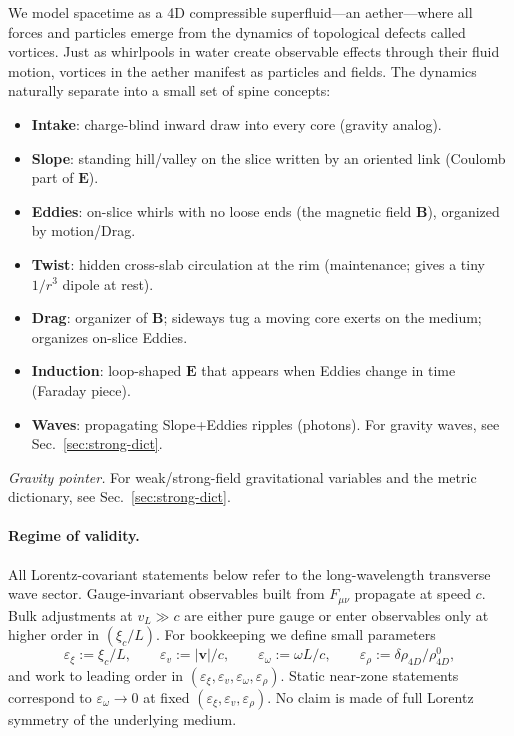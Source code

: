 We model spacetime as a 4D compressible superfluid---an aether---where all forces and particles emerge from the dynamics of topological defects called vortices. Just as whirlpools in water create observable effects through their fluid motion, vortices in the aether manifest as particles and fields. The dynamics naturally separate into a small set of spine concepts:
\begin{itemize}
  \item \textbf{Intake}: charge-blind inward draw into every core (gravity analog).
  \item \textbf{Slope}: standing hill/valley on the slice written by an oriented link (Coulomb part of $\mathbf E$).
  \item \textbf{Eddies}: on-slice whirls with no loose ends (the magnetic field $\mathbf B$), organized by motion/Drag.
  \item \textbf{Twist}: hidden cross-slab circulation at the rim (maintenance; gives a tiny $1/r^3$ dipole at rest).
  \item \textbf{Drag}: organizer of $\mathbf B$; sideways tug a moving core exerts on the medium; organizes on-slice Eddies.
  \item \textbf{Induction}: loop-shaped $\mathbf E$ that appears when Eddies change in time (Faraday piece).
  \item \textbf{Waves}: propagating Slope+Eddies ripples (photons). For gravity waves, see Sec.~\ref{sec:strong-dict}.
\end{itemize}
\noindent\emph{Gravity pointer.} For weak/strong-field gravitational variables and the metric dictionary, see Sec.~\ref{sec:strong-dict}.
\paragraph{Regime of validity.} All Lorentz-covariant statements below refer to the long-wavelength transverse wave sector. Gauge-invariant observables built from $F_{\mu\nu}$ propagate at speed $c$. Bulk adjustments at $v_L\gg c$ are either pure gauge or enter observables only at higher order in $(\xi_c/L)$. For bookkeeping we define small parameters
\[
\varepsilon_\xi:=\xi_c/L,\qquad
\varepsilon_v:=|\mathbf v|/c,\qquad
\varepsilon_\omega:=\omega L/c,\qquad
\varepsilon_\rho:=\delta\rho_{4D}/\rho_{4D}^0,
\]
and work to leading order in $(\varepsilon_\xi,\varepsilon_v,\varepsilon_\omega,\varepsilon_\rho)$. Static near-zone statements correspond to $\varepsilon_\omega\to0$ at fixed $(\varepsilon_\xi,\varepsilon_v,\varepsilon_\rho)$. No claim is made of full Lorentz symmetry of the underlying medium.

